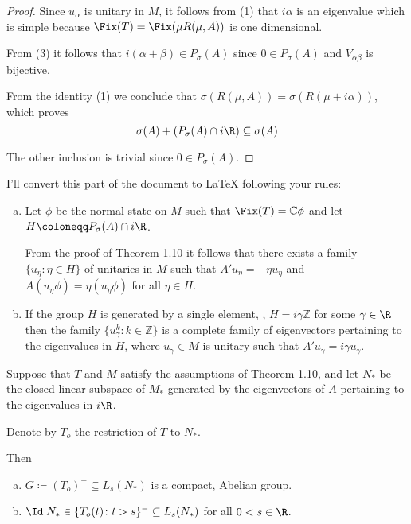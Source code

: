 \begin{proof}
Since $u_{\alpha}$ is unitary in $M$, it follows from (1) that $i\alpha$ is an eigenvalue which is simple because $\Fix(T) = \Fix(\mu R(\mu,A))$ is one dimensional.

From (3) it follows that $i(\alpha+\beta) \in P_{\sigma}(A)$ since $0 \in P_{\sigma}(A)$ and $V_{\alpha\beta}$ is bijective.

From the identity (1) we conclude that $\sigma(R(\mu,A)) = \sigma(R(\mu+i\alpha))$, which proves
\[
\sigma(A) + (P_{\sigma}(A) \cap i\R) \subseteq \sigma(A)
\]

The other inclusion is trivial since $0 \in P_{\sigma}(A)$.
\end{proof}


I'll convert this part of the document to LaTeX following your rules:

\begin{remarks}\label{rem:d3-1.11}
\begin{enumerate}[(a)]
\item Let $\phi$ be the normal state on $M$ such that $\Fix(T) = \mathbb{C}\phi$ and let $H \coloneqq P_{\sigma}(A) \cap i\R$.

From the proof of Theorem 1.10 it follows that there exists a family $\{u_{\eta} \colon \eta \in H\}$ of unitaries in $M$ such that $A'u_{\eta} = -\eta u_{\eta}$ and $A(u_{\eta}\phi) = \eta(u_{\eta}\phi)$ for all $\eta \in H$.

\item If the group $H$ is generated by a single element, \ie, $H = i\gamma\mathbb{Z}$ for some $\gamma \in \R$ then the family $\{u_{\gamma}^{k} \colon k \in \mathbb{Z}\}$ is a complete family of eigenvectors pertaining to the eigenvalues in $H$, where $u_{\gamma} \in M$ is unitary such that $A'u_{\gamma} = i\gamma u_{\gamma}$.
\end{enumerate}
\end{remarks}

\begin{proposition}\label{prop:d3-1.12}
Suppose that $T$ and $M$ satisfy the assumptions of Theorem 1.10, and let $N_{*}$ be the closed linear subspace of $M_{*}$ generated by the eigenvectors of $A$ pertaining to the eigenvalues in $i\R$.

Denote by $T_{o}$ the restriction of $T$ to $N_{*}$.

Then
\begin{enumerate}[(a)]
\item $G \coloneqq (T_{o})^{-} \subseteq L_{s}(N_{*})$ is a compact, Abelian group.

\item $\Id|N_{*}\in\{T_{o}(t) \colon t>s\}^{-} \subseteq L_{s}(N_{*})$ for all $0<s \in \R$.
\end{enumerate}
\end{proposition}

